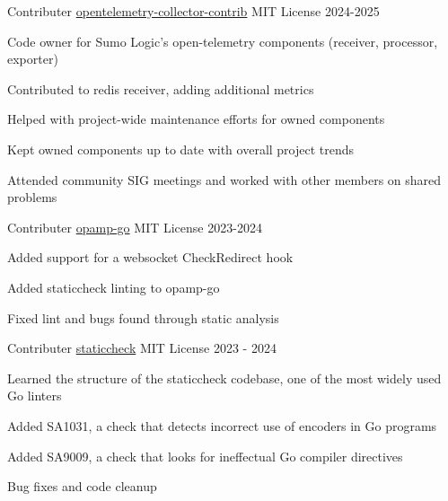 


\begin{cventries}
  \cventry
    {Contributer}
    {\href{https://github.com/open-telemetry/opentelemetry-collector-contrib}{opentelemetry-collector-contrib}}
    {MIT License}
    {2024-2025}
    {
		\begin{cvitems}
  		  \item{Code owner for Sumo Logic's open-telemetry components (receiver, processor, exporter)}
		  \item{Contributed to redis receiver, adding additional metrics}
		  \item{Helped with project-wide maintenance efforts for owned components}
		  \item{Kept owned components up to date with overall project trends}
		  \item{Attended community SIG meetings and worked with other members on shared problems}
		\end{cvitems}
	}


  \cventry
    {Contributer}
    {\href{https://github.com/open-telemetry/opamp-go}{opamp-go}}
    {MIT License}
    {2023-2024}
    {
      \begin{cvitems}
        \item{Added support for a websocket CheckRedirect hook}
        \item{Added staticcheck linting to opamp-go}
        \item{Fixed lint and bugs found through static analysis}
      \end{cvitems}
    }


  \cventry
    {Contributer}
    {\href{https://github.com/dominikh/go-tools}{staticcheck}}
    {MIT License}
    {2023 - 2024}
    {
      \begin{cvitems}
        \item{Learned the structure of the staticcheck codebase, one of the most widely used Go linters}
        \item{Added SA1031, a check that detects incorrect use of encoders in Go programs}
        \item{Added SA9009, a check that looks for ineffectual Go compiler directives}
        \item{Bug fixes and code cleanup}
      \end{cvitems}
    }



\end{cventries}
